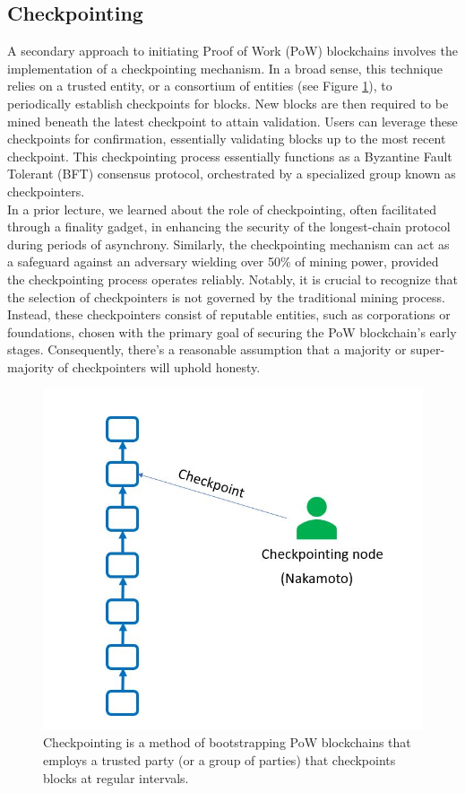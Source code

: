 \documentclass{report}
\begin{document}
\subsection{Checkpointing}
A secondary approach to initiating Proof of Work (PoW) blockchains involves the implementation of a checkpointing mechanism. In a broad sense, this technique relies on a trusted entity, or a consortium of entities (see Figure \ref{fig:f2}), to periodically establish checkpoints for blocks. New blocks are then required to be mined beneath the latest checkpoint to attain validation. Users can leverage these checkpoints for confirmation, essentially validating blocks up to the most recent checkpoint. This checkpointing process essentially functions as a Byzantine Fault Tolerant (BFT) consensus protocol, orchestrated by a specialized group known as checkpointers.\\
In a prior lecture, we learned about the role of checkpointing, often facilitated through a finality gadget, in enhancing the security of the longest-chain protocol during periods of asynchrony. Similarly, the checkpointing mechanism can act as a safeguard against an adversary wielding over 50\% of mining power, provided the checkpointing process operates reliably. Notably, it is crucial to recognize that the selection of checkpointers is not governed by the traditional mining process. Instead, these checkpointers consist of reputable entities, such as corporations or foundations, chosen with the primary goal of securing the PoW blockchain's early stages. Consequently, there's a reasonable assumption that a majority or super-majority of checkpointers will uphold honesty.\\
\begin{center}
	\begin{figure}
		\centering
		\includegraphics[width=0.5\linewidth]{Fig/F2}
		\caption{Checkpointing is a method of bootstrapping PoW blockchains that employs a trusted party (or a group of parties) that checkpoints blocks at regular intervals.}
		\label{fig:f2}
	\end{figure}
\end{center}
\end{document}
